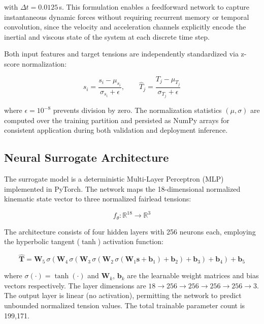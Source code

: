 \documentclass[preprint,12pt]{elsarticle}
\begin{document}
\noindent with $\Delta t = 0.0125$\,s. This formulation enables a feedforward network to capture instantaneous dynamic forces without requiring recurrent memory or temporal convolution, since the velocity and acceleration channels explicitly encode the inertial and viscous state of the system at each discrete time step.

Both input features and target tensions are independently standardized via z-score normalization:

\begin{equation}
\label{eq:znorm}
    \hat{s}_i = \frac{s_i - \mu_{s_i}}{\sigma_{s_i} + \epsilon}, \qquad
    \hat{T}_j = \frac{T_j - \mu_{T_j}}{\sigma_{T_j} + \epsilon}
\end{equation}

\noindent where $\epsilon = 10^{-8}$ prevents division by zero. The normalization statistics $(\mu, \sigma)$ are computed over the training partition and persisted as NumPy arrays for consistent application during both validation and deployment inference.

\subsection{Neural Surrogate Architecture}
\label{sec:architecture}

The surrogate model is a deterministic Multi-Layer Perceptron (MLP) implemented in PyTorch. The network maps the 18-dimensional normalized kinematic state vector to three normalized fairlead tensions:

\begin{equation}
\label{eq:mlp}
    f_\theta : \mathbb{R}^{18} \rightarrow \mathbb{R}^{3}
\end{equation}

\noindent The architecture consists of four hidden layers with 256 neurons each, employing the hyperbolic tangent ($\tanh$) activation function:

\begin{equation}
\label{eq:network}
    \hat{\mathbf{T}} = \mathbf{W}_5 \, \sigma\!\left(\mathbf{W}_4 \, \sigma\!\left(\mathbf{W}_3 \, \sigma\!\left(\mathbf{W}_2 \, \sigma\!\left(\mathbf{W}_1 \mathbf{s} + \mathbf{b}_1\right) + \mathbf{b}_2\right) + \mathbf{b}_3\right) + \mathbf{b}_4\right) + \mathbf{b}_5
\end{equation}

\noindent where $\sigma(\cdot) = \tanh(\cdot)$ and $\mathbf{W}_k$, $\mathbf{b}_k$ are the learnable weight matrices and bias vectors respectively. The layer dimensions are $18 \to 256 \to 256 \to 256 \to 256 \to 3$. The output layer is linear (no activation), permitting the network to predict unbounded normalized tension values. The total trainable parameter count is 199,171.
\end{document}
